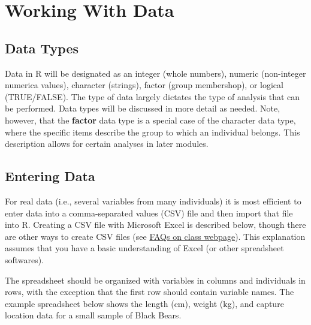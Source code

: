 \documentclass[10pt,openany]{book}\usepackage[]{graphicx}\usepackage[]{color}
\begin{document}
\vspace{-12pt}


\section{Working With Data}
\vspace{-12pt}
\subsection{Data Types}  \label{sect:RDataTypes}
\vspace{-12pt}
Data in R will be designated as an integer (whole numbers), numeric (non-integer numerica values), character (strings), factor (group membershop), or logical (TRUE/FALSE).  The type of data largely dictates the type of analysis that can be performed.  Data types will be discussed in more detail as needed.  Note, however, that the \textbf{factor} data type is a special case of the character data type, where the specific items describe the group to which an individual belongs.  This description allows for certain analyses in later modules.


\vspace{-12pt}
\subsection{Entering Data}  \label{sect:REnterData}
\vspace{-12pt}
For real data (i.e., several variables from many individuals) it is most efficient to enter data into a comma-separated values (CSV) file and then import that file into R.  Creating a CSV file with Microsoft Excel is described below, though there are other ways to create CSV files (see \href{http://derekogle.com/NCMTH107/resources/FAQ/}{FAQs on class webpage}).  This explanation assumes that you have a basic understanding of Excel (or other spreadsheet softwares).


The spreadsheet should be organized with variables in columns and individuals in rows, with the exception that the first row should contain variable names.  The example spreadsheet below shows the length (cm), weight (kg), and capture location data for a small sample of Black Bears.
\end{document}
